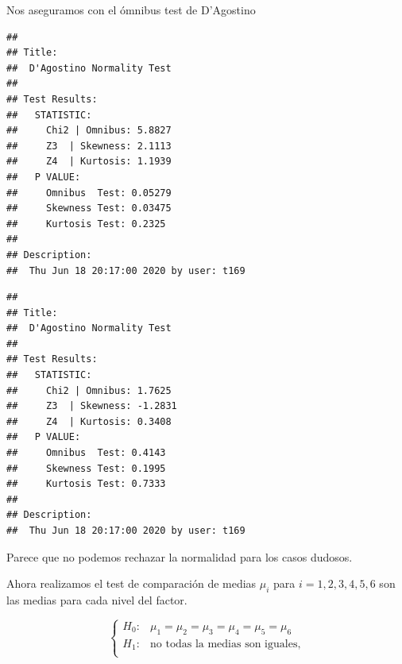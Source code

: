 \documentclass[
]{article}
\newenvironment{Shaded}{\begin{snugshade}}{\end{snugshade}}
\newcommand{\KeywordTok}[1]{\textcolor[rgb]{0.13,0.29,0.53}{\textbf{#1}}}
\newcommand{\NormalTok}[1]{#1}
\newcommand{\OperatorTok}[1]{\textcolor[rgb]{0.81,0.36,0.00}{\textbf{#1}}}
\newcommand{\StringTok}[1]{\textcolor[rgb]{0.31,0.60,0.02}{#1}}
\begin{document}
Nos aseguramos con el ómnibus test de D'Agostino

\begin{Shaded}
\end{Shaded}

\begin{verbatim}
## 
## Title:
##  D'Agostino Normality Test
## 
## Test Results:
##   STATISTIC:
##     Chi2 | Omnibus: 5.8827
##     Z3  | Skewness: 2.1113
##     Z4  | Kurtosis: 1.1939
##   P VALUE:
##     Omnibus  Test: 0.05279 
##     Skewness Test: 0.03475 
##     Kurtosis Test: 0.2325 
## 
## Description:
##  Thu Jun 18 20:17:00 2020 by user: t169
\end{verbatim}

\begin{Shaded}
\end{Shaded}

\begin{verbatim}
## 
## Title:
##  D'Agostino Normality Test
## 
## Test Results:
##   STATISTIC:
##     Chi2 | Omnibus: 1.7625
##     Z3  | Skewness: -1.2831
##     Z4  | Kurtosis: 0.3408
##   P VALUE:
##     Omnibus  Test: 0.4143 
##     Skewness Test: 0.1995 
##     Kurtosis Test: 0.7333 
## 
## Description:
##  Thu Jun 18 20:17:00 2020 by user: t169
\end{verbatim}

Parece que no podemos rechazar la normalidad para los casos dudosos.

Ahora realizamos el test de comparación de medias \(\mu_i\) para
\(i=1,2,3,4,5,6\) son las medias para cada nivel del factor.

\[
\left\{
\begin{array}{ll}
H_0: & \mu_1=\mu_2=\mu_3=\mu_4=\mu_5=\mu_6\\
H_1: & \mbox{no todas la medias son iguales,}\\
\end{array}
\right.
\]

\begin{Shaded}
\end{Shaded}
\end{document}
